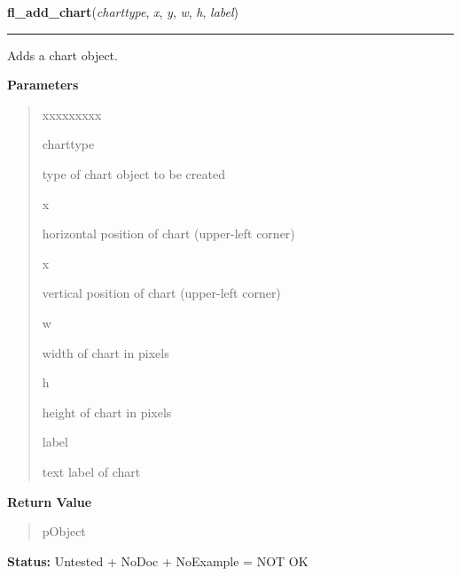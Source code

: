     \label{xformslib:library:fl_add_chart}

    \vspace{0.5ex}

\hspace{.8\funcindent}\begin{boxedminipage}{\funcwidth}

    \raggedright \textbf{fl\_add\_chart}(\textit{charttype}, \textit{x}, \textit{y}, \textit{w}, \textit{h}, \textit{label})

    \vspace{-1.5ex}

    \rule{\textwidth}{0.5\fboxrule}
\setlength{\parskip}{2ex}
    Adds a chart object.

\setlength{\parskip}{1ex}
      \textbf{Parameters}
      \vspace{-1ex}

      \begin{quote}
        \begin{Ventry}{xxxxxxxxx}

          \item[charttype]

          type of chart object to be created

          \item[x]

          horizontal position of chart (upper-left corner)

          \item[x]

          vertical position of chart (upper-left corner)

          \item[w]

          width of chart in pixels

          \item[h]

          height of chart in pixels

          \item[label]

          text label of chart

        \end{Ventry}

      \end{quote}

      \textbf{Return Value}
    \vspace{-1ex}

      \begin{quote}
      pObject

      \end{quote}

\textbf{Status:} Untested + NoDoc + NoExample = NOT OK



    \end{boxedminipage}

